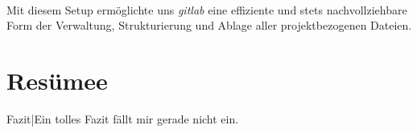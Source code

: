 \paragraph{}Mit diesem Setup ermöglichte uns \textit{gitlab} eine effiziente und stets nachvollziehbare Form der Verwaltung, Strukturierung und Ablage aller projektbezogenen Dateien.

\newpage
\section{Resümee}
Fazit\todo|{Ein tolles Fazit fällt mir gerade nicht ein.}




